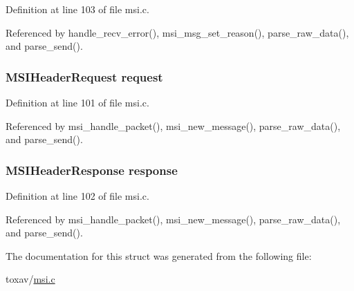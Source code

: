 Definition at line 103 of file msi.\+c.



Referenced by handle\+\_\+recv\+\_\+error(), msi\+\_\+msg\+\_\+set\+\_\+reason(), parse\+\_\+raw\+\_\+data(), and parse\+\_\+send().

\hypertarget{struct___m_s_i_message_a43928947ba3f33772bdeee09fd89557a}{
\subsubsection[{request}]{\setlength{\rightskip}{0pt plus 5cm}M\+S\+I\+Header\+Request request}}\label{struct___m_s_i_message_a43928947ba3f33772bdeee09fd89557a}


Definition at line 101 of file msi.\+c.



Referenced by msi\+\_\+handle\+\_\+packet(), msi\+\_\+new\+\_\+message(), parse\+\_\+raw\+\_\+data(), and parse\+\_\+send().

\hypertarget{struct___m_s_i_message_a03f0f34008bf8be095af614ca99ea53f}{
\subsubsection[{response}]{\setlength{\rightskip}{0pt plus 5cm}M\+S\+I\+Header\+Response response}}\label{struct___m_s_i_message_a03f0f34008bf8be095af614ca99ea53f}


Definition at line 102 of file msi.\+c.



Referenced by msi\+\_\+handle\+\_\+packet(), msi\+\_\+new\+\_\+message(), parse\+\_\+raw\+\_\+data(), and parse\+\_\+send().



The documentation for this struct was generated from the following file\+:\begin{DoxyCompactItemize}
\item 
toxav/\hyperlink{msi_8c}{msi.\+c}\end{DoxyCompactItemize}
